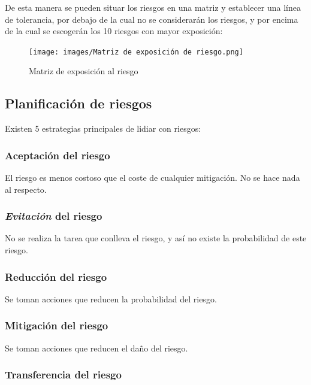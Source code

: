 \documentclass[12pt]{article}
\begin{document}
{De esta manera se pueden situar los riesgos en una matriz y establecer una línea de tolerancia, por debajo de la cual no se considerarán los riesgos, y por encima de la cual se escogerán los 10 riesgos con mayor exposición:}

\begin{figure} [ht]
    \centering
    \texttt{[image: images/Matriz de exposición de riesgo.png]}
    \caption{Matriz de exposición al riesgo}
    \label{fig:7.2}
\end{figure}

\newpage
\subsection{Planificación de riesgos}
\label{7.7.0}

{Existen 5 estrategias principales de lidiar con riesgos:}

\subsubsection{Aceptación del riesgo}
\label{7.7.1}

{El riesgo es menos costoso que el coste de cualquier mitigación. No se hace nada al respecto.}

\subsubsection{\textit{Evitación} del riesgo}
\label{7.7.2}

{No se realiza la tarea que conlleva el riesgo, y así no existe la probabilidad de este riesgo.}

\subsubsection{Reducción del riesgo}
\label{7.7.3}

{Se toman acciones que reducen la probabilidad del riesgo.}

\subsubsection{Mitigación del riesgo}
\label{7.7.4}

{Se toman acciones que reducen el daño del riesgo.}

\subsubsection{Transferencia del riesgo}
\label{7.7.5}
\end{document}
